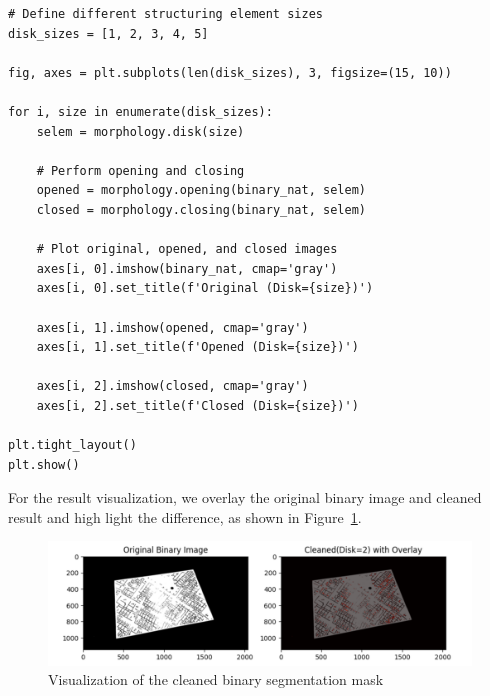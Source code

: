 \documentclass[12pt]{article}
\begin{document}
\begin{lstlisting}
# Define different structuring element sizes
disk_sizes = [1, 2, 3, 4, 5]

fig, axes = plt.subplots(len(disk_sizes), 3, figsize=(15, 10))

for i, size in enumerate(disk_sizes):
    selem = morphology.disk(size)

    # Perform opening and closing
    opened = morphology.opening(binary_nat, selem)
    closed = morphology.closing(binary_nat, selem)

    # Plot original, opened, and closed images
    axes[i, 0].imshow(binary_nat, cmap='gray')
    axes[i, 0].set_title(f'Original (Disk={size})')

    axes[i, 1].imshow(opened, cmap='gray')
    axes[i, 1].set_title(f'Opened (Disk={size})')

    axes[i, 2].imshow(closed, cmap='gray')
    axes[i, 2].set_title(f'Closed (Disk={size})')

plt.tight_layout()
plt.show()
\end{lstlisting}

For the result visualization, we overlay the original binary image and cleaned result and high light the difference, as shown in Figure~\ref{fig:viz}.

\begin{figure}[ht]
    \centering
        \includegraphics[width=\textwidth]{pics/a7-4.3}
    \caption{Visualization of the cleaned binary segmentation mask}
    \label{fig:viz}
\end{figure}
\end{document}

